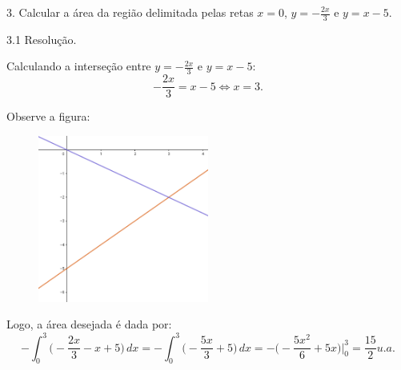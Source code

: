\documentclass{article}
\begin{document}
{\begin{newpage}
\par
\vspace{0.3cm}
\begin{flushleft}
3. Calcular a área da região delimitada pelas retas $x=0$, $y=-\displaystyle{\frac{2x}{3}}$ e $y=x-5$.
\end{flushleft}
\par
\vspace{0.3cm}
\begin{flushleft}
3.1 Resolução.
\end{flushleft}
\par Calculando a interseção entre $y=-\displaystyle{\frac{2x}{3}}$ e $y=x-5$:
\begin{equation*} \displaystyle{-\frac{2x}{3} = x-5 \Leftrightarrow x=3}. \end{equation*}
\par
\vspace{1cm} Observe a figura:
\begin{figure}[htbp]
\begin{center}
\includegraphics[width=0.5\textwidth, angle=0]{Grafico14.png}
\end{center}
\end{figure}     
\par Logo, a área desejada é dada por:
\begin{equation*} \displaystyle{-\int_{0}^{3} \Big(-\frac{2x}{3} - x + 5  \Big)\, dx = -\int_{0}^{3} \Big(-\frac{5x}{3} + 5 \Big)\, dx = -\Big(-\frac{5x^2}{6} + 5x \Big)\Big|^{3}_{0} = \frac{15}{2} u.a.}\end{equation*}
\par
\vspace{0.3cm}

\end{newpage}}
\end{document}
